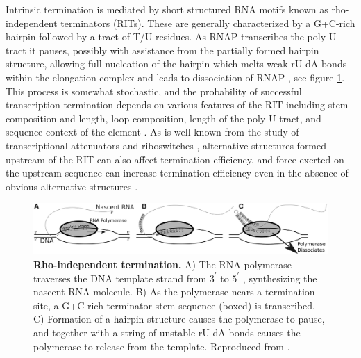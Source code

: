 Intrinsic termination is mediated by short structured RNA motifs known as rho-independent terminators (RITs). These are generally characterized by a G+C-rich hairpin followed by a tract of T/U residues. As RNAP transcribes the poly-U tract it pauses, possibly with assistance from the partially formed hairpin structure, allowing full nucleation of the hairpin which melts weak rU-dA bonds within the elongation complex and leads to dissociation of RNAP \parencite{Peters2011}, see figure \ref{fig:rho}. This process is somewhat stochastic, and the probability of successful transcription termination depends on various features of the RIT including stem composition and length, loop composition, length of the poly-U tract, and sequence context of the element \parencite{Larson2008, Cambray2013, Chen2013}. As is well known from the study of transcriptional attenuators and riboswitches \parencite{Henkin2002, Barrick2007, Naville2010}, alternative structures formed upstream of the RIT can also affect termination efficiency, and force exerted on the upstream sequence can increase termination efficiency even in the absence of obvious alternative structures \parencite{Larson2008}.

\begin{figure}[htp]
\begin{center}
\includegraphics[width=14cm]{rhoindy.jpg}
\caption[Rho-independent termination]{\textbf{Rho-independent termination.} A) The RNA polymerase traverses the DNA template strand from $3^\prime$  to $5^\prime$ , synthesizing the nascent RNA molecule. B) As the polymerase nears a termination site, a G+C-rich terminator stem sequence (boxed) is transcribed. C) Formation of a hairpin structure causes the polymerase to pause, and together with a string of unstable rU-dA bonds causes the polymerase to release from the template. Reproduced from \textcite{Gardner2011a}.
} 
\label{fig:rho}
\end{center}
\end{figure}

